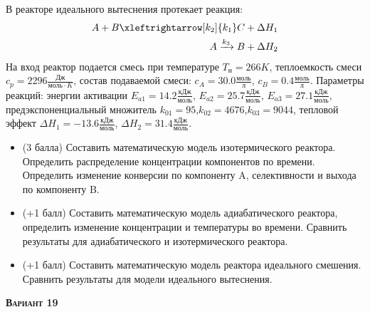  В реакторе идеального вытеснения протекает реакция: \begin{equation*} \begin{aligned} A+B \xleftrightarrow[k_2]{k_1} C +\Delta H_1 \\ A \xrightarrow{k_3} B + \Delta H_2 \end{aligned} \end{equation*}                                     На вход  реактор подается смесь при температуре $ T_н =  266 K$, теплоемкость смеси $c_p= 2296 \frac{Дж}{моль \cdot K}$, состав подаваемой смеси: $c_A=30.0 \frac{моль}{л}$, $c_B=0.4 \frac{моль}{л}$. Параметры реакций: энергии активации $E_{a1}=14.2 \frac{кДж}{моль}$, $E_{a2}=25.7  \frac{кДж}{моль}$, $E_{a3}=27.1  \frac{кДж}{моль}$, предэкспоненциальный множитель $k_{01}=        95$,$k_{02}=      4676$,$k_{03}=      9044$, тепловой эффект $\Delta H_1= -13.6  \frac{кДж}{моль}$, $\Delta H_2=31.4 \frac{кДж}{моль}$.\begin{itemize} \item (3 балла) Составить математическую модель изотермического реактора. Определить распределение концентрации компонентов по времени. Определить изменение конверсии по компоненту A, селективности и выхода по компоненту B. \item (+1 балл) Составить математическую модель адиабатического реактора, определить изменение концентрации и температуры во времени. Сравнить результаты для адиабатического и изотермического реактора. \item (+1 балл) Составить математическую модель реактора идеального смешения. Сравнить результаты для модели идеального вытеснения. \end{itemize}

\textsc{\textbf{Вариант 19}}

